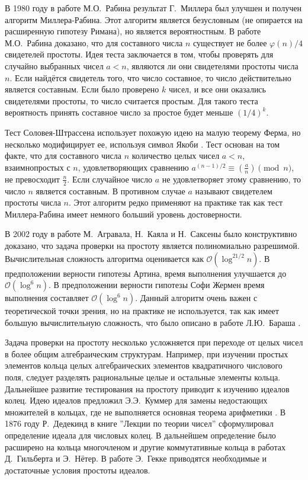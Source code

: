 \documentclass[_00_dissertation.tex]{subfiles}
\begin{document}
В 1980 году в работе М.О.~Рабина \cite{source:Rabin} результат Г.~Миллера был улучшен и получен алгоритм Миллера-Рабина.
Этот алгоритм является безусловным (не опирается на расширенную гипотезу Римана), но является вероятностным.
В работе М.О.~Рабина доказано, что для составного числа $n$ существует не более $\varphi(n)/4$ свидетелей простоты.
Идея теста заключается в том, чтобы проверять для случайно выбранных чисел $a < n$, являются ли они свидетелями простоты числа $n$.
Если найдётся свидетель того, что число составное, то число действительно является составным.
Если было проверено $k$ чисел, и все они оказались свидетелями простоты, то число считается простым.
Для такого теста вероятность принять составное число за простое будет меньше $(1/4)^{k}$.

Тест Соловея-Штрассена использует похожую идею на малую теорему Ферма, но несколько модифицирует ее, используя символ Якоби \cite{source:Solovay}.
Тест основан на том факте, что для составного числа $n$ количество целых чисел $a < n$, взаимнопростых с $n$, удовлетворяющих сравнению $a^{{(n-1)/2}}\equiv \left({\frac{a}{n}}\right){\pmod{n}}$, не превосходит $\frac{n}{2}$.
Если случайное число $a$ не удовлетворяет этому сравнению, то число $n$ является составным.
В противном случае $a$ называют свидетелем простоты числа $n$.
Этот алгоритм редко применяют на практике так как тест Миллера-Рабина имеет немного больший уровень достоверности.

В 2002 году в работе М.~Агравала, Н.~Каяла и Н.~Саксены \cite{source:AKS} было конструктивно доказано, что задача проверки на простоту является полиномиально разрешимой.
Вычислительная сложность алгоритма оценивается как $\mathcal{O}(\log ^{21/2}n)$.
В предположении верности гипотезы Артина, время выполнения улучшается до $\mathcal{O}(\log ^{6}n)$.
В предположении верности гипотезы Софи Жермен время выполнения составляет $\mathcal{O}(\log ^{6}n)$.
Данный алгоритм очень важен с теоретической точки зрения, но на практике не используется, так как имеет большую вычислительную сложность, что было описано в работе Л.Ю.~Бараша \cite{source:Barash}.

Задача проверки на простоту несколько усложняется при переходе от целых чисел в более общим алгебраическим структурам.
Например, при изучении простых элементов кольца целых алгебраических элементов квадратичного числового поля, следует разделять рациональные целые и остальные элементы кольца.
Дальнейшее развитие тестирования на простоту приводит к изучению идеалов колец.
Идею идеалов предложил Э.Э.~Куммер для замены недостающих множителей в кольцах, где не выполняется основная теорема арифметики \cite{source:Stillwell}.
В 1876 году Р.~Дедекинд в книге ''Лекции по теории чисел'' \cite{source:Dedekind} сформулировал определение идеала для числовых колец.
В дальнейшем определение было расширено на кольца многочленом и другие коммутативные кольца в работах Д.~Гильберта и Э.~Нётер.
В работе Э.~Гекке \cite{source:Gekke} приводятся необходимые и достаточные условия простоты идеалов.
\end{document}
